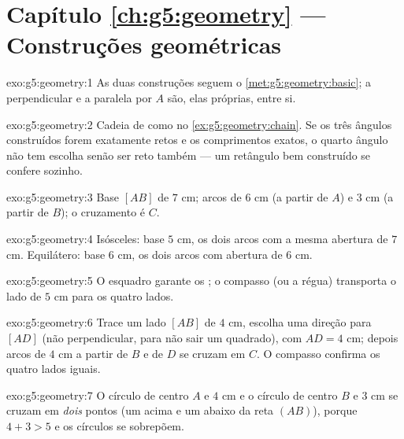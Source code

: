 \section*{Capítulo \ref{ch:g5:geometry} --- Construções geométricas}

\begin{solution}{exo:g5:geometry:1}
As duas construções seguem o \cref{met:g5:geometry:basic}; a
perpendicular e a paralela por $A$ são, elas próprias,
 entre si.
\end{solution}

\begin{solution}{exo:g5:geometry:2}
Cadeia de  como no \cref{ex:g5:geometry:chain}. Se os
três ângulos construídos forem exatamente retos e os comprimentos
exatos, o quarto ângulo não tem escolha senão ser reto também --- um
retângulo bem construído se confere sozinho.
\end{solution}

\begin{solution}{exo:g5:geometry:3}
Base $[AB]$ de $7$ cm; arcos de  $6$ cm (a partir de $A$) e
$3$ cm (a partir de $B$); o cruzamento é $C$.
\end{solution}

\begin{solution}{exo:g5:geometry:4}
Isósceles: base $5$ cm, os dois arcos com a mesma abertura de
$7$ cm. Equilátero: base $6$ cm, os dois arcos com abertura de
$6$ cm.
\end{solution}

\begin{solution}{exo:g5:geometry:5}
O esquadro garante os ; o compasso (ou a régua)
transporta o lado de $5$ cm para os quatro lados.
\end{solution}

\begin{solution}{exo:g5:geometry:6}
Trace um lado $[AB]$ de $4$ cm, escolha uma direção para $[AD]$ (não
perpendicular, para não sair um quadrado), com $AD = 4$ cm; depois
arcos de $4$ cm a partir de $B$ e de $D$ se cruzam em $C$. O compasso
confirma os quatro lados iguais.
\end{solution}

\begin{solution}{exo:g5:geometry:7}
O círculo de centro $A$ e  $4$ cm e o círculo de centro $B$ e
 $3$ cm se cruzam em \emph{dois} pontos (um acima e um abaixo da
reta $(AB)$), porque $4 + 3 > 5$ e os círculos se sobrepõem.
\end{solution}

